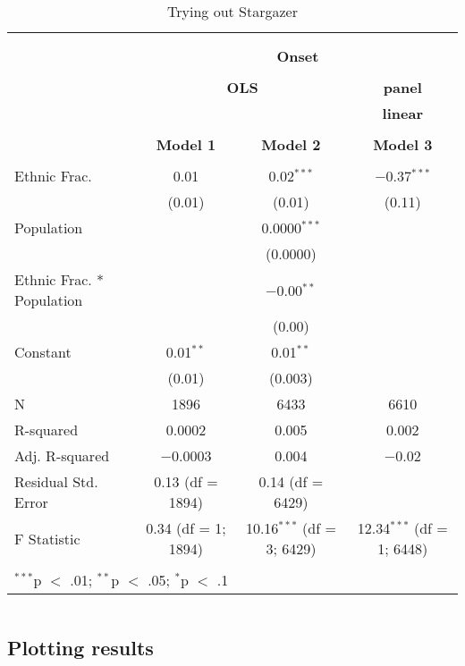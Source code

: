 \begin{table}[!h] \centering 
  \caption{Trying out Stargazer} 
  \label{tab:stargazer} 
\begin{tabular}{@{\extracolsep{5pt}}lccc} 
\\[-1.8ex]\hline \\[-1.8ex] 
\\[-1.8ex] & \multicolumn{3}{c}{\textbf{Onset}} \\ 
\\[-1.8ex] & \multicolumn{2}{c}{\textbf{OLS}} & \textbf{panel} \\ 
 & \multicolumn{2}{c}{\textbf{}} & \textbf{linear} \\ 
\\[-1.8ex] & \textbf{Model 1} & \textbf{Model 2} & \textbf{Model 3}\\ 
\hline \\[-1.8ex] 
 Ethnic Frac. & 0.01 & 0.02$^{***}$ & $-$0.37$^{***}$ \\ 
  & (0.01) & (0.01) & (0.11) \\ 
  Population &  & 0.0000$^{***}$ &  \\ 
  &  & (0.0000) &  \\ 
  Ethnic Frac. * Population &  & $-$0.00$^{**}$ &  \\ 
  &  & (0.00) &  \\ 
  Constant & 0.01$^{**}$ & 0.01$^{**}$ &  \\ 
  & (0.01) & (0.003) &  \\ 
 N & 1896 & 6433 & 6610 \\ 
R-squared & 0.0002 & 0.005 & 0.002 \\ 
Adj. R-squared & $-$0.0003 & 0.004 & $-$0.02 \\ 
Residual Std. Error & 0.13 (df = 1894) & 0.14 (df = 6429) &  \\ 
F Statistic & 0.34 (df = 1; 1894) & 10.16$^{***}$ (df = 3; 6429) & 12.34$^{***}$ (df = 1; 6448) \\ 
\hline \\[-1.8ex] 
\multicolumn{4}{l}{$^{***}$p $<$ .01; $^{**}$p $<$ .05; $^{*}$p $<$ .1} \\ 
\end{tabular} 
\end{table} 

\begin{lstlisting}

\end{lstlisting}

\subsection{Plotting results} 